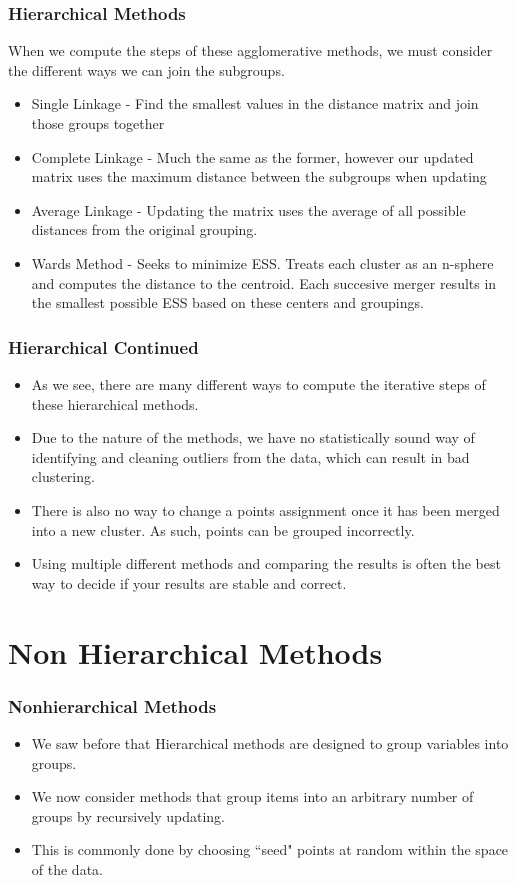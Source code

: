 \documentclass{beamer}
\begin{document}
\begin{frame}
\frametitle{Hierarchical Methods}
When we compute the steps of these agglomerative methods, we must consider the different ways we can join the subgroups.
\begin{itemize}
\item Single Linkage - Find the smallest values in the distance matrix and join those groups together
\item Complete Linkage - Much the same as the former, however our updated matrix uses the maximum distance between the subgroups when updating
\item Average Linkage - Updating the matrix uses the average of all possible distances from the original grouping.
\item Wards Method - Seeks to minimize ESS. Treats each cluster as an n-sphere and computes the distance to the centroid. Each succesive merger results in the smallest possible ESS based on these centers and groupings.
\end{itemize}
\end{frame}

\begin{frame}
\frametitle{Hierarchical Continued}
\begin{itemize}
\item As we see, there are many different ways to compute the iterative steps of these hierarchical methods.
\pause
\item Due to the nature of the methods, we have no statistically sound way of identifying and cleaning outliers from the data, which can result in bad clustering.
\pause
\item There is also no way to change a points assignment once it has been merged into a new cluster. As such, points can be grouped incorrectly.
\pause
\item Using multiple different methods and comparing the results is often the best way to decide if your results are stable and correct.
\end{itemize}
\end{frame}

\section{Non Hierarchical Methods}
\begin{frame}
\frametitle{Nonhierarchical Methods}
\begin{itemize}
\item We saw before that Hierarchical methods are designed to group variables into groups.
\item We now consider methods that group items into an arbitrary number of groups by recursively updating.
\item This is commonly done by choosing ``seed" points at random within the space of the data.
\end{itemize}
\end{frame}
\end{document}
